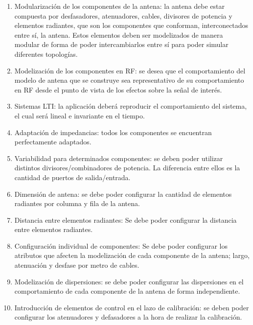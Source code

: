 \begin{enumerate}
    \item Modularización de los componentes de la antena: la antena debe estar compuesta por desfasadores, atenuadores, cables,
		divisores de potencia y elementos radiantes, que son los componentes que conforman, interconectados entre sí, la antena. Estos
		elementos deben ser modelizados de manera modular de forma de poder intercambiarlos entre sí para poder simular diferentes
		topologías.

	\item Modelización de los componentes en RF: se desea que el comportamiento del modelo de antena que se construye sea 
		representativo de su comportamiento en RF desde el punto de vista de los efectos sobre la señal de interés.

    \item Sistemas LTI: la aplicación deberá reproducir el comportamiento del sistema, el cual será lineal e invariante
		en el tiempo.

	\item Adaptación de impedancias: todos los componentes se encuentran perfectamente adaptados.

    \item Variabilidad para determinados componentes: se deben poder utilizar distintos divisores/combinadores de potencia.
		La diferencia entre ellos es la cantidad de puertos de salida/entrada.

    \item Dimensión de antena: se debe poder configurar la cantidad de elementos radiantes por columna y fila de la antena.
    \item Distancia entre elementos radiantes: Se debe poder configurar la distancia entre elementos radiantes.

    \item Configuración individual de componentes: Se debe poder configurar los atributos que afecten la modelización de cada
		componente de la antena; largo, atenuación y desfase por metro de cables.

    \item Modelización de dispersiones: se debe poder configurar las dispersiones en el comportamiento de cada componente de la
		antena de forma independiente.

    \item Introducción de elementos de control en el lazo de calibración: se deben poder configurar los atenuadores y
		defasadores a la hora de realizar la calibración.


\end{enumerate}
